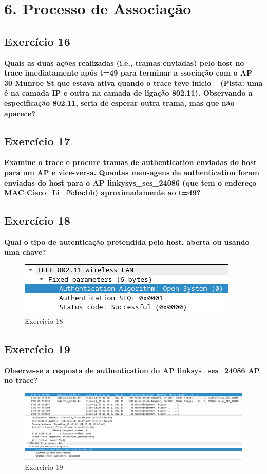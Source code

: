 \documentclass[a4paper]{report}
\begin{document}
\chapter{6. Processo de Associação}
\section{Exercício 16}
\textbf{Quais as duas ações realizadas (i.e., tramas enviadas) pelo host no
    trace imediatamente após t=49 para terminar a ssociação com o AP 30 Munroe
    St que estava ativa quando o trace teve inicio= (Pista: uma é na camada IP e
    outra na camada de ligação 802.11). Observando a especificação 802.11, seria
    de esperar outra trama, mas que não aparece?}

\section{Exercício 17}
\textbf{Examine o trace e procure tramas de authentication enviadas do host para
    um AP e vice-versa. Quantas mensagens de authentication foram enviadas do
    host para o AP linkysys\_ses\_24086 (que tem o endereço MAC
    Cisco\_Li\_f5:ba:bb) aproximadamente ao t=49?}

\section{Exercício 18}
\textbf{Qual o tipo de autenticação pretendida pelo host, aberta ou usando uma
    chave?}
\begin{figure}[H]
    \centering 
    \includegraphics[width=\textwidth]{images/ex18.png}  
    \caption{Exercicio 18}
    \label{fig:ex18}
\end{figure}

\section{Exercício 19}
\textbf{Observa-se a resposta de authentication do AP linksys\_ses\_24086 AP no
    trace?}
\begin{figure}[H]
    \centering 
    \includegraphics[width=\textwidth]{images/ex19.png}  
    \caption{Exercicio 19}
    \label{fig:ex19}
\end{figure}
\end{document}
